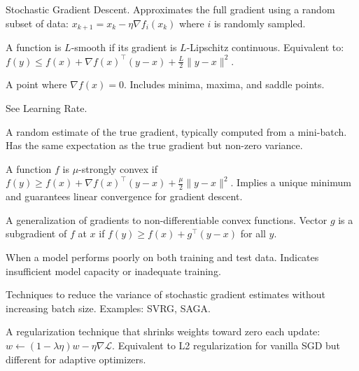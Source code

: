 \documentclass[../main.tex]{subfiles}
\begin{document}
\begin{description}[style=nextline, leftmargin=2cm, labelwidth=1.8cm]
\item[SGD]
Stochastic Gradient Descent. Approximates the full gradient using a random subset of data: $x_{k+1} = x_k - \eta \nabla f_i(x_k)$ where $i$ is randomly sampled.

\item[Smoothness]
A function is $L$-smooth if its gradient is $L$-Lipschitz continuous. Equivalent to: $f(y) \leq f(x) + \nabla f(x)^\top(y-x) + \frac{L}{2}\|y-x\|^2$.

\item[Stationary Point]
A point where $\nabla f(x) = 0$. Includes minima, maxima, and saddle points.

\item[Step Size]
See Learning Rate.

\item[Stochastic Gradient]
A random estimate of the true gradient, typically computed from a mini-batch. Has the same expectation as the true gradient but non-zero variance.

\item[Strong Convexity]
A function $f$ is $\mu$-strongly convex if $f(y) \geq f(x) + \nabla f(x)^\top(y-x) + \frac{\mu}{2}\|y-x\|^2$. Implies a unique minimum and guarantees linear convergence for gradient descent.

\item[Subgradient]
A generalization of gradients to non-differentiable convex functions. Vector $g$ is a subgradient of $f$ at $x$ if $f(y) \geq f(x) + g^\top(y-x)$ for all $y$.

\item[Underfitting]
When a model performs poorly on both training and test data. Indicates insufficient model capacity or inadequate training.

\item[Variance Reduction]
Techniques to reduce the variance of stochastic gradient estimates without increasing batch size. Examples: SVRG, SAGA.

\item[Weight Decay]
A regularization technique that shrinks weights toward zero each update: $w \leftarrow (1-\lambda\eta)w - \eta\nabla\mathcal{L}$. Equivalent to L2 regularization for vanilla SGD but different for adaptive optimizers.

\end{description}
\end{document}
